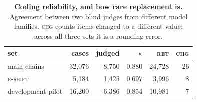 \begin{table}[t]
\centering\small
\begin{tabular}{lrrrrr}
\toprule
set & cases & judged & $\kappa$ & \textsc{ret} & \textsc{chg} \\
\midrule
main chains & 32,076 & 8,750 & 0.880 & 24,728 & 26 \\
\textsc{e-shift} & 5,184 & 1,425 & 0.697 & 3,996 & 8 \\
development pilot & 16,200 & 6,386 & 0.854 & 10,981 & 7 \\
\bottomrule
\end{tabular}
\caption{\textbf{Coding reliability, and how rare replacement is.} Agreement between two blind judges from different model families. \textsc{chg} counts items changed to a different value; across all three sets it is a rounding error.}
\label{tab:judges}
\end{table}
